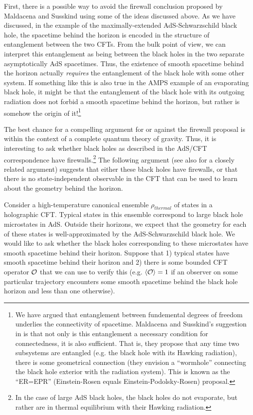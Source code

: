 \documentclass[12pt,epsf]{article}
\begin{document}
First, there is a possible way to avoid the firewall conclusion proposed by Maldacena and Susskind \cite{Maldacena:2013xja} using some of the ideas discussed above. As we have discussed, in the example of the maximally-extended AdS-Schwarzschild black hole, the spacetime behind the horizon is encoded in the structure of entanglement between the two CFTs. From the bulk point of view, we can interpret this entanglement as being between the black holes in the two separate asymptotically AdS spacetimes. Thus, the existence of smooth spacetime behind the horizon actually {\it requires} the entanglement of the black hole with some other system. If something like this is also true in the AMPS example of an evaporating black hole, it might be that the entanglement of the black hole with its outgoing radiation does not forbid a smooth spacetime behind the horizon, but rather is somehow the origin of it!\footnote{We have argued that entanglement between fundemental degrees of freedom underlies the connectivity of spacetime. Maldacena and Susskind's suggestion in \cite{Maldacena:2013xja} is that not only is this entanglement a necessary condition for connectedness, it is also sufficient. That is, they propose that any time two subsystems are entangled (e.g. the black hole with its Hawking radiation), there is some geometrical connection (they envision a ``wormhole'' connecting the black hole exterior with the radiation system). This is known as the ``ER=EPR'' (Einstein-Rosen equals Einstein-Podolsky-Rosen) proposal.}

The best chance for a compelling argument for or against the firewall proposal is within the context of a complete quantum theory of gravity. Thus, it is interesting to ask whether black holes as described in the AdS/CFT correspondence have firewalls.\footnote{In the case of large AdS black holes, the black holes do not evaporate, but rather are in thermal equilibrium with their Hawking radiation.} The following argument \cite{VanRaamsdonk:2013sza} (see also \cite{Marolf:2013dba} for a closely related argument) suggests that either these black holes have firewalls, or that there is no state-independent observable in the CFT that can be used to learn about the geometry behind the horizon.

Consider a high-temperature canonical ensemble $\rho_{thermal}$ of states in a holographic CFT. Typical states in this ensemble correspond to large black hole microstates in AdS. Outside their horizons, we expect that the geometry for each of these states is well-approximated by the AdS-Schwarzschild black hole. We would like to ask whether the black holes corresponding to these microstates have smooth spacetime behind their horizon. Suppose that 1) typical states have smooth spacetime behind their horizon and 2) there is some bounded CFT operator ${\cal O}$ that we can use to verify this (e.g. $\langle {\cal O} \rangle = 1$ if an observer on some particular trajectory encounters some smooth spacetime behind the black hole horizon and less than one otherwise).
\end{document}
